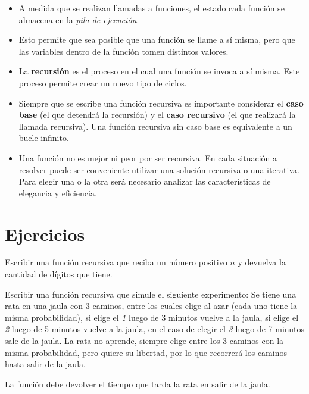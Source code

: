 \begin{itemize}

\item A medida que se realizan llamadas a funciones, el estado cada
función se almacena en la \emph{pila de ejecución}.

\item Esto permite que sea posible que una función se llame a sí misma,
pero que las variables dentro de la función tomen distintos valores.

\item La {\bf recursión} es el proceso en el cual una función se invoca a
sí misma.  Este proceso permite crear un nuevo tipo de ciclos.

\item Siempre que se escribe una función recursiva es importante considerar
el {\bf caso base} (el que detendrá la recursión) y el {\bf caso
recursivo} (el que realizará la llamada recursiva).  Una función recursiva
sin caso base es equivalente a un bucle infinito.

\item Una función no es mejor ni peor por ser recursiva.  En cada situación
a resolver puede ser conveniente utilizar una solución recursiva o una
iterativa.  Para elegir una o la otra será necesario analizar las
características de elegancia y eficiencia.

\end{itemize}


\newpage
\section{Ejercicios}

\begin{ejercicio}
Escribir una función recursiva que reciba un número positivo $n$ y devuelva
la cantidad de dígitos que tiene.
\end{ejercicio}

\begin{ejercicio}
Escribir una función recursiva que simule el siguiente experimento:
Se tiene una rata en una jaula con 3 caminos, entre los cuales elige
al azar (cada uno tiene la misma probabilidad), si elige el \emph{1} luego
de 3 minutos vuelve a la jaula, si elige el \emph{2} luego de 5 minutos vuelve a
la jaula, en el caso de elegir el \emph{3} luego de 7 minutos sale de la jaula.
La rata no aprende, siempre elige entre los 3 caminos con la misma probabilidad,
pero quiere su libertad, por lo que recorrerá los caminos hasta salir de la jaula.

La función debe devolver el tiempo que tarda la rata en salir de la jaula.
\end{ejercicio}

